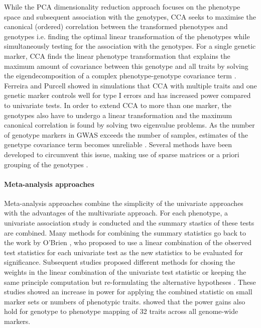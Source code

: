 While the PCA dimensionality reduction approach focuses on the phenotype space and subsequent association with the genotypes, CCA  seeks to maximise the canonical (ordered) correlation between the transformed phenotypes and genotypes i.e. finding the optimal linear transformation of the phenotypes while simultaneously testing for the association with the genotypes.  For a single genetic marker, CCA finds the linear phenotype transformation that explains the maximum amount of covariance between this genotype and all traits by solving the eigendecomposition of a complex phenotype-genotype covariance term \citep{Yang2012b}. Ferreira and Purcell \parencite*{Ferreira2009} showed in simulations that CCA with multiple traits and one genetic marker controls well for type I errors and has increased power compared to univariate tests. In order to extend CCA to more than one marker, the genotypes also have to undergo a linear transformation and the maximum canonical correlation is found by solving two eigenvalue problems. As the number of genotype markers in GWAS exceeds the number of samples, estimates of the genetype covariance term becomes unreliable \citep{Schaefer2005}. Several methods have been developed to circumvent this issue, making use of sparse matrices \citep{Parkhomenko2009} or a priori grouping of the genotypes \citep{Naylor2010}. 

\paragraph{Meta-analysis approaches} Meta-analysis approaches combine the simplicity of the univariate approaches with the advantages of the multivariate approach. For each phenotype, a univariate association study is conducted and the summary stastics of these tests are combined. Many methods for combining the summary statistics \citep{Xu2003,Yang2010,Bolormaa2014} go back to the work by O'Brien \citep{OBrien1984}, who proposed to use a linear combination of the observed test statistics for each univariate test as the new statistics to be evaluated for significance. Subsequent studies proposed different methods for chosing the weights in the linear combination of the univariate test statistic or keeping the same principle computation but re-formulating the alternative hypotheses \citep{Yang2010,Xu2003}. These studies showed an increase in power for applying the combined statistic on small marker sets or numbers of phenotypic traits. \citet{Bolormaa2014} showed that the power gains also hold for genotype to phenotype mapping of 32 traits across all genome-wide markers. 


